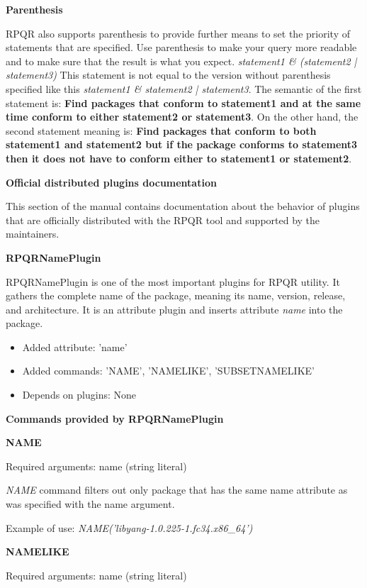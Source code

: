 \textbf{Parenthesis}

RPQR also supports parenthesis to provide further means to set the priority of statements that are specified.
Use parenthesis to make your query more readable and to make sure that the result is what you expect.
\textit{statement1 \& (statement2 | statement3)} This statement is not equal to the version without
parenthesis specified like this \textit{statement1 \& statement2 | statement3}. The semantic of the first
statement is: \textbf{Find packages that conform to statement1 and at the same time conform to either
statement2 or statement3}. On the other hand, the second statement meaning is: \textbf{Find packages
that conform to both statement1 and statement2 but if the package conforms to statement3 then it does not
have to conform either to statement1 or statement2}.

\newpage

\textbf{Official distributed plugins documentation}

This section of the manual contains documentation about the behavior of plugins that are officially
distributed with the RPQR tool and supported by the maintainers.

\textbf{RPQRNamePlugin}

RPQRNamePlugin is one of the most important plugins for RPQR utility. It gathers the complete name of the
package, meaning its name, version, release, and architecture. It is an attribute plugin and inserts
attribute \textit{name} into the package.

\begin{itemize}
  \item Added attribute: 'name'
  \item Added commands: 'NAME', 'NAMELIKE', 'SUBSETNAMELIKE'
  \item Depends on plugins: None
\end{itemize}

\textbf{Commands provided by RPQRNamePlugin}

\textbf{NAME}

Required arguments: name (string literal)

\textit{NAME} command filters out only package that has the same name attribute as was specified
with the name argument.

Example of use: \textit{NAME('libyang-1.0.225-1.fc34.x86\_64')}

\textbf{NAMELIKE}

Required arguments: name (string literal)


